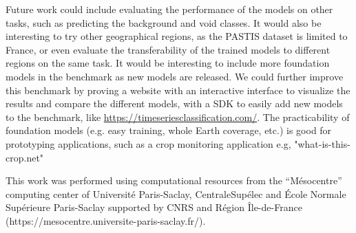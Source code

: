 \documentclass[11pt]{article}
\begin{document}
Future work could include evaluating the performance of the models on
other tasks, such as predicting the background and void classes.
It would also be interesting to try other geographical regions, as
the PASTIS dataset is limited to France, or even evaluate the
transferability of the trained models to different regions on the
same task. It would be interesting to include more foundation
models in the benchmark as new models are released.
We could further improve this benchmark by proving a website with an
interactive interface to visualize the results and compare the
different models, with a SDK to easily add new models to the
benchmark, like \url{https://timeseriesclassification.com/}.
The practicability of foundation models (e.g. easy training, whole Earth
coverage, etc.) is good for prototyping applications, such as a
crop monitoring application e.g, "what-is-this-crop.net"

\newpage

\printbibliography

This work was performed using computational resources from the
“Mésocentre” computing center of Université Paris-Saclay,
CentraleSupélec and École Normale Supérieure Paris-Saclay supported
by CNRS and Région Île-de-France
(https://mesocentre.universite-paris-saclay.fr/).




\end{document}

